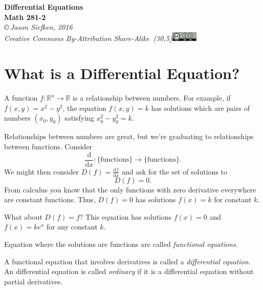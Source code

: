 \documentclass{problemset}
\newcommand{\R}{\mathbb{R}}
\renewcommand{\d}{\mathrm{d}}
\begin{document}
\pagestyle{fancy}
\renewcommand{\headrulewidth}{0pt}

\begin{center}
	{\huge\bf Differential Equations \\{\sc Math 281-2}}\\

\vspace{.7in}
{
\it \copyright\,Jason Siefken, 2016 \\
Creative Commons By-Attribution Share-Alike\, \makebox(30,5){\includegraphics[height=1.2em]{by-sa.pdf}}
}
\end{center}

\section*{What is a Differential Equation?}


	A function $f:\R^n\to \R$ is a relationship between numbers.
	For example, if $f(x,y)=x^2-y^2$, the equation $f(x,y)=k$ has solutions which are pairs of numbers 
	$(x_0,y_0)$ satisfying $x_0^2-y_0^2=k$.

	Relationships between numbers are great, but we're graduating
	to relationships between functions.  Consider
	\[
		\frac{\d}{\d x}:\{\text{functions}\}\to\{\text{functions}\}.
	\]
	We might then consider $D(f) = \frac{\d f}{\d x}$ and ask for the set of solutions
	to
	\[
		D(f) = 0.
	\]
	From calculus you know that the only functions with zero derivative everywhere
	are constant functions.  Thus, $D(f)=0$ has solutions $f(x)=k$ for constant $k$.

	What about $D(f)=f$?  This equation has solutions $f(x)=0$ and $f(x)=ke^x$ for any
	constant $k$.

	Equation where the solutions are functions are called \emph{functional equations}.

	\begin{definition}
		A functional equation that involves derivatives is called
		a \emph{differential equation}.  An differential equation
		is called \emph{ordinary} if it is a differential equation
		without partial derivatives.
	\end{definition}
\end{document}
